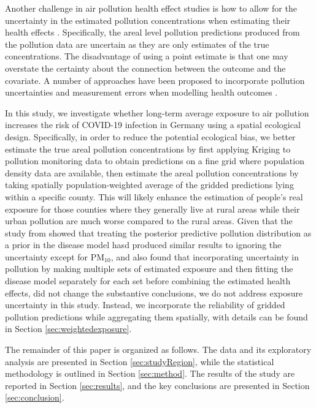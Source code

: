 \documentclass[12,]{article}
\begin{document}
Another challenge in air pollution health effect studies is how to allow
for the uncertainty in the estimated pollution concentrations when
estimating their health effects \autocites{Huang2018}{Blair2007}.
Specifically, the areal level pollution predictions produced from the
pollution data are uncertain as they are only estimates of the true
concentrations. The disadvantage of using a point estimate is that one
may overstate the certainty about the connection between the outcome and
the covariate. A number of approaches have been proposed to incorporate
pollution uncertainties and measurement errors when modelling health
outcomes
\autocites[e.g.,][]{Huang2018}{Lee2017}{Blangiardo2016}{Gryparis2009}.

In this study, we investigate whether long-term average exposure to air
pollution increases the risk of COVID-19 infection in Germany using a
spatial ecological design. Specifically, in order to reduce the
potential ecological bias, we better estimate the true areal pollution
concentrations by first applying Kriging to pollution monitoring data to
obtain predictions on a fine grid where population density data are
available, then estimate the areal pollution concentrations by taking
spatially population-weighted average of the gridded predictions lying
within a specific county. This will likely enhance the estimation of
people's real exposure for those counties where they generally live at
rural areas while their urban pollution are much worse compared to the
rural areas. Given that the study from \textcite{Lee2017} showed that
treating the posterior predictive pollution distribution as a prior in
the disease model hasd produced similar results to ignoring the
uncertainty except for PM\(_{10}\), and \textcite{Blangiardo2016} also
found that incorporating uncertainty in pollution by making multiple
sets of estimated exposure and then fitting the disease model separately
for each set before combining the estimated health effects, did not
change the substantive conclusions, we do not address exposure
uncertainty in this study. Instead, we incorporate the reliability of
gridded pollution predictions while aggregating them spatially, with
details can be found in Section \ref{sec:weightedexposure}.

The remainder of this paper is organized as follows. The data and its
exploratory analysis are presented in Section \ref{sec:studyRegion},
while the statistical methodology is outlined in Section
\ref{sec:method}. The results of the study are reported in Section
\ref{sec:results}, and the key conclusions are presented in Section
\ref{sec:conclusion}.
\end{document}
